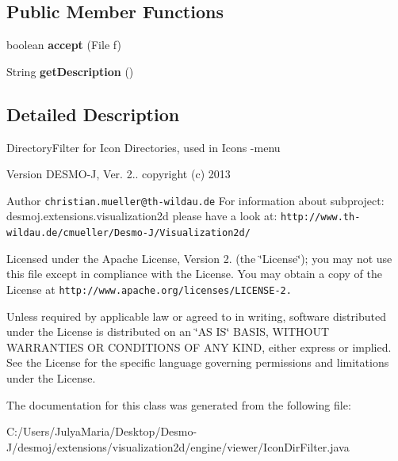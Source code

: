 \subsection*{Public Member Functions}
\begin{DoxyCompactItemize}
\item 
boolean {\bfseries accept} (File f)\label{classdesmoj_1_1extensions_1_1visualization2d_1_1engine_1_1viewer_1_1_icon_dir_filter_ab7b64a5ea21ab95296e7254d0e6db9d3}

\item 
String {\bfseries get\-Description} ()\label{classdesmoj_1_1extensions_1_1visualization2d_1_1engine_1_1viewer_1_1_icon_dir_filter_a9abdc1465dbeda5256397ea2c7b97eb7}

\end{DoxyCompactItemize}


\subsection{Detailed Description}
Directory\-Filter for Icon Directories, used in Icons -\/menu

\begin{DoxyVersion}{Version}
D\-E\-S\-M\-O-\/\-J, Ver. 2.. copyright (c) 2013 
\end{DoxyVersion}
\begin{DoxyAuthor}{Author}
{\tt christian.\-mueller@th-\/wildau.\-de} For information about subproject\-: desmoj.\-extensions.\-visualization2d please have a look at\-: {\tt http\-://www.\-th-\/wildau.\-de/cmueller/\-Desmo-\/\-J/\-Visualization2d/}
\end{DoxyAuthor}
Licensed under the Apache License, Version 2. (the \char`\"{}\-License\char`\"{}); you may not use this file except in compliance with the License. You may obtain a copy of the License at {\tt http\-://www.\-apache.\-org/licenses/\-L\-I\-C\-E\-N\-S\-E-\/2.}

Unless required by applicable law or agreed to in writing, software distributed under the License is distributed on an \char`\"{}\-A\-S I\-S\char`\"{} B\-A\-S\-I\-S, W\-I\-T\-H\-O\-U\-T W\-A\-R\-R\-A\-N\-T\-I\-E\-S O\-R C\-O\-N\-D\-I\-T\-I\-O\-N\-S O\-F A\-N\-Y K\-I\-N\-D, either express or implied. See the License for the specific language governing permissions and limitations under the License. 

The documentation for this class was generated from the following file\-:\begin{DoxyCompactItemize}
\item 
C\-:/\-Users/\-Julya\-Maria/\-Desktop/\-Desmo-\/\-J/desmoj/extensions/visualization2d/engine/viewer/Icon\-Dir\-Filter.\-java\end{DoxyCompactItemize}
